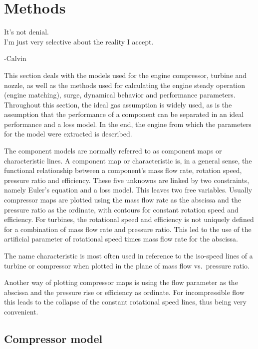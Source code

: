 \documentclass[tcc]{subfiles}
\begin{document}
\chapter{Methods}
\label{sec:methods}
\epigraph{It's not denial. \\ I'm just very selective about the reality I accept.}{-Calvin}

This section deals with the models used for the engine compressor, turbine and nozzle, 
as well as the methods used for calculating the engine steady operation (engine matching), 
surge, dynamical behavior and performance parameters. 
Throughout this section, the ideal gas assumption is widely used, 
as is the assumption that the performance of a component can be separated in an ideal performance and a loss model. 
In the end, the engine from which the parameters for the model were extracted is described.

The component models are normally referred to as component maps or characteristic lines. 
A component map or characteristic is, in a general sense, the functional relationship between a component's
mass flow rate, rotation speed, pressure ratio and efficiency. 
These five unknowns are linked by two constraints, namely Euler's equation and a loss model. 
This leaves two free variables.
Usually compressor maps are plotted using the mass flow rate as the abscissa and  the pressure ratio as the ordinate, with contours for constant rotation speed and efficiency. 
For turbines, the rotational speed and efficiency is not uniquely defined for a combination of mass flow rate and pressure ratio. This led to the use of the artificial parameter of rotational speed times mass flow rate for the abscissa.

The name characteristic is most often used in reference to the iso-speed lines of a turbine or compressor when plotted in the plane of mass flow vs.\ pressure ratio.

Another way of plotting compressor maps is using the flow parameter as the abscissa and  the pressure rise or efficiency as ordinate. 
For incompressible flow this leads to the collapse of the constant rotational speed lines, thus being very convenient.


\section{Compressor model}


\end{document}

